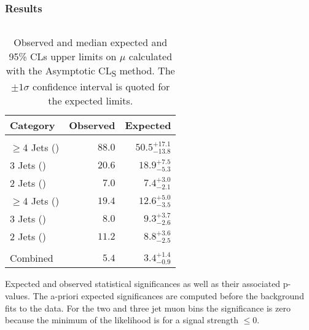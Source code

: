 \begin{frame}
	\frametitle{Results}
	\vspace*{-0.24cm}
	\begin{columns}[T]
		\begin{column}{0.6\textwidth}
			\vspace*{-0.6cm}
			\begin{table}[htbp]
				\color{black}
				\caption*{\scriptsize Observed and median expected and 95\% CLs upper limits on $\mu$ calculated with the Asymptotic CL\textsubscript{S} method. The $\pm1\sigma$ confidence interval is quoted for the expected limits.}
				\label{tab:95percent_upper_confidence_levels}
				\centering
				\scriptsize
				\vspace*{-0.15cm}
				\begin{tabular}{|l|r|r|} \hline
					\textbf{Category}                   & \textbf{Observed} & \textbf{Expected} \\
					\hline\\[-2.55ex]
					$\geqslant$4 Jets (\Pe)             & $88.0$   & $50.5_{-13.8}^{+17.1}$ \\
					3 Jets (\Pe)                        & $20.6$   & $18.9_{-5.3}^{+7.5}$   \\
					2 Jets (\Pe)                        & $7.0$    & $7.4_{-2.1}^{+3.0}$    \\
					$\geqslant$4 Jets (\Pmu)            & $19.4$   & $12.6_{-3.5}^{+5.0}$   \\
					3 Jets (\Pmu)                       & $8.0$    & $9.3_{-2.6}^{+3.7}$    \\
					2 Jets (\Pmu)                       & $11.2$   & $8.8_{-2.5}^{+3.6}$    \\
					\hline\\[-2.55ex]
					Combined                            & $5.4$   & $3.4_{-0.9}^{+1.4}$     \\
					\hline
				\end{tabular}
			\end{table}
			\vspace*{-0.2cm}
			\begin{table}[htbp]
				\color{black}
				\label{tab:significances_and_pvalues}
				\caption*{\scriptsize Expected and observed statistical significances as well as their associated p-values. The a-priori expected significances are computed before the background fits to the data. For the two and three jet muon bins the significance is zero because the minimum of the likelihood is for a signal strength $\leqslant0$.}
				\centering

\end{table}
\end{column}
\end{columns}
\end{frame}
